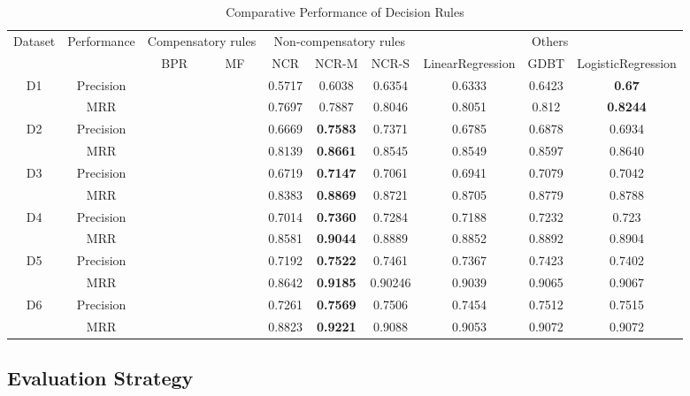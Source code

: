 \documentclass[sigconf]{acmart}
\begin{document}
\begin{table*}
\caption{Comparative Performance of Decision Rules }
\label{tab:decision}
\begin{tabular}{|c|c|c|c|c|c|c|c|c|c|}
\hline
\multirow{2}{*}{Dataset} & \multirow{2}{*}{Performance}
& \multicolumn{2}{|c|}{Compensatory rules} & \multicolumn{3}{|c|}{Non-compensatory rules} & \multicolumn{3}{|c|}{Others} \\
\cline{3-10} & & BPR & MF & NCR & NCR-M & NCR-S & LinearRegression & GDBT & LogisticRegression \\\hline
\multirow{2}{*}{D1} &Precision	& & &	0.5717 & 0.6038 & 0.6354 &	0.6333 & 0.6423 &\bf{0.67}\\
\cline{2-10}	    &MRR		& & &0.7697 & 0.7887 & 0.8046 &0.8051 & 0.812	 &\bf{0.8244}\\\hline
\multirow{2}{*}{D2} &Precision  & & &0.6669 & \bf{0.7583} & 0.7371 &	0.6785 & 0.6878	& 0.6934\\
\cline{2-10}		 &MRR		& & &	0.8139 &\bf{0.8661} & 0.8545 & 0.8549 & 0.8597	& 0.8640\\\hline
\multirow{2}{*}{D3} &Precision & & & 0.6719 & \bf{0.7147} & 0.7061 &	0.6941 & 0.7079 & 0.7042\\
\cline{2-10} 		&MRR		& & & 0.8383 &\bf{0.8869} & 0.8721 & 0.8705 &0.8779 & 0.8788\\\hline
\multirow{2}{*}{D4} &Precision & & & 0.7014 & \bf{0.7360} & 0.7284 & 0.7188 & 0.7232 & 0.723\\
\cline{2-10} 		&MRR		& & & 0.8581& \bf{0.9044} & 0.8889 &	0.8852 & 0.8892& 0.8904\\\hline
\multirow{2}{*}{D5} &Precision	& &&	0.7192 &\bf{0.7522} &0.7461 & 0.7367 & 0.7423 &0.7402\\
\cline{2-10}		 &MRR		& && 0.8642 &\bf{0.9185} & 0.90246 & 0.9039 &	0.9065 & 0.9067\\\hline
\multirow{2}{*}{D6} &Precision	& && 0.7261 &\bf{0.7569} & 0.7506 & 0.7454 & 0.7512 & 0.7515\\
\cline{2-10}   		&MRR		& &&	0.8823& \bf{0.9221} &	0.9088 & 0.9053 & 0.9072 & 0.9072\\\hline
\end{tabular}
\end{table*}




\subsection{Evaluation Strategy}
\end{document}
